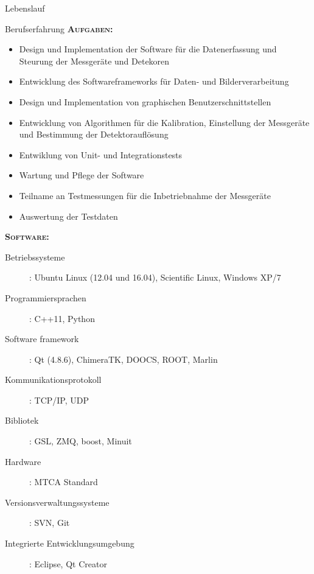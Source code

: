 \documentclass[11pt,a4paper]{scrartcl}
\begin{document}
\begin{cv}{Lebenslauf}
\begin{cvlist}{Berufserfahrung}
{\scshape {\bfseries Aufgaben:}}
\begin{itemize}
  \item Design und Implementation der Software f{\"u}r die Datenerfassung und
  Steurung der Messger{\"a}te und Detekoren
  \item Entwicklung des Softwareframeworks f{\"u}r Daten- und
  Bilderverarbeitung
  \item Design und Implementation von graphischen Benutzerschnittstellen
  \item Entwicklung von Algorithmen f{\"u}r die Kalibration, 
  Einstellung der Messger{\"a}te und Bestimmung der Detektoraufl{\"o}sung
  \item Entwiklung von Unit- und Integrationstests
  \item Wartung und Pflege der Software
  \item Teilname an Testmessungen f{\"u}r die Inbetriebnahme der Messger{\"a}te
  \item Auswertung der Testdaten
\end{itemize}
{\scshape {\bfseries Software:}}
\begin{description}
\item[Betriebssysteme] : Ubuntu Linux (12.04 und 16.04), Scientific Linux,
Windows XP/7
\item[Programmiersprachen] : C++11, Python
\item[Software framework] : Qt (4.8.6), ChimeraTK, DOOCS, ROOT, Marlin
\item[Kommunikationsprotokoll] : TCP/IP, UDP
\item[Bibliotek] : GSL, ZMQ, boost, Minuit
\item[Hardware] : MTCA Standard
\item[Versionsverwaltungssysteme] : SVN, Git
\item[Integrierte Entwicklungsumgebung] : Eclipse, Qt Creator
\end{description}


\end{cvlist}
\end{cv}
\end{document}
